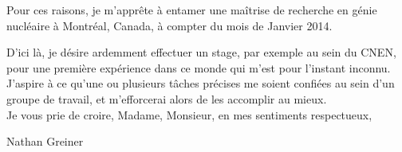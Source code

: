 \documentclass[a4paper,oneside,12pt]{article}
\begin{document}
Pour ces raisons, je m'apprête à entamer une maîtrise de recherche en génie nucléaire à Montréal, Canada, à compter du mois de Janvier 2014. 

D'ici là, je désire ardemment effectuer un stage, par exemple au sein du CNEN, pour une première expérience dans ce monde qui m'est pour l'instant inconnu. J'aspire à ce qu'une ou plusieurs tâches précises me soient confiées au sein d'un groupe de travail, et m'efforcerai alors de les accomplir au mieux. \\

Je vous prie de croire, Madame, Monsieur, en mes sentiments respectueux, \\

\vspace{5mm}

\hspace{10cm} Nathan Greiner
\end{document}
